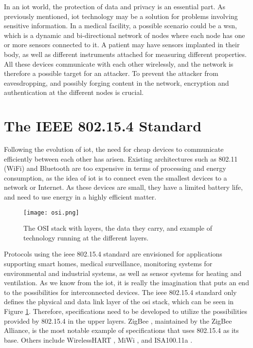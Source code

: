 In an \gls{iot} world, the protection of data and privacy is an essential part. As previously mentioned, \gls{iot} technology may be a solution for problems involving sensitive information. In a medical facility, a possible scenario could be a \gls{wsn}, which is a dynamic and bi-directional network of nodes where each node has one or more sensors connected to it. A patient may have sensors implanted in their body, as well as different instruments attached for measuring different properties. All these devices communicate with each other wirelessly, and the network is therefore a possible target for an attacker. To prevent the attacker from eavesdropping, and possibly forging content in the network, encryption and authentication at the different nodes is crucial.








\section{The IEEE 802.15.4 Standard}
\label{sec:802154}

Following the evolution of \gls{iot}, the need for cheap devices to communicate efficiently between each other has arisen. Existing architectures such as 802.11 (WiFi) and Bluetooth are too expensive in terms of processing and energy consumption, as the idea of \gls{iot} is to connect even the smallest devices to a network or Internet. As these devices are small, they have a limited battery life, and need to use energy in a highly efficient matter.

\begin{figure}[h]
	\centering
	\texttt{[image: osi.png]}
	\caption{The OSI stack with layers, the data they carry, and example of technology running at the different layers.}
	\label{fig:osi}
\end{figure}

Protocols using the \gls{ieee} 802.15.4 standard are envisioned for applications supporting smart homes, medical surveillance, monitoring systems for environmental and industrial systems, as well as sensor systems for heating and ventilation. As we know from the \gls{iot}, it is really the imagination that puts an end to the possibilities for interconnected devices. The \gls{ieee} 802.15.4 standard only defines the physical and data link layer of the \gls{osi} stack, which can be seen in Figure \ref{fig:osi}. Therefore, specifications need to be developed to utilize the possibilities provided by 802.15.4 in the upper layers. ZigBee \cite{zigbee}, maintained by the ZigBee Alliance, is the most notable example of specifications that uses 802.15.4 as its base. Others include WirelessHART \citep{wirelesshart}, MiWi \cite{miwi}, and ISA100.11a \cite{isa100}.

